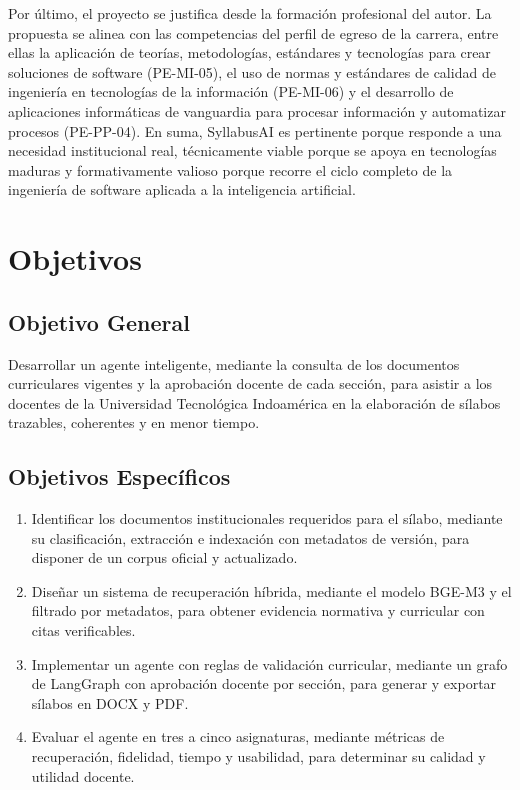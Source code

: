 Por último, el proyecto se justifica desde la formación profesional del autor. La propuesta se alinea con las competencias del perfil de egreso de la carrera, entre ellas la aplicación de teorías, metodologías, estándares y tecnologías para crear soluciones de software (PE-MI-05), el uso de normas y estándares de calidad de ingeniería en tecnologías de la información (PE-MI-06) y el desarrollo de aplicaciones informáticas de vanguardia para procesar información y automatizar procesos (PE-PP-04). En suma, SyllabusAI es pertinente porque responde a una necesidad institucional real, técnicamente viable porque se apoya en tecnologías maduras y formativamente valioso porque recorre el ciclo completo de la ingeniería de software aplicada a la inteligencia artificial.

\section{Objetivos}
\subsection{Objetivo General}
Desarrollar un agente inteligente, mediante la consulta de los documentos curriculares vigentes y la aprobación docente de cada sección, para asistir a los docentes de la Universidad Tecnológica Indoamérica en la elaboración de sílabos trazables, coherentes y en menor tiempo.

\subsection{Objetivos Específicos}
\begin{enumerate}
  \item Identificar los documentos institucionales requeridos para el sílabo, mediante su clasificación, extracción e indexación con metadatos de versión, para disponer de un corpus oficial y actualizado.
  \item Diseñar un sistema de recuperación híbrida, mediante el modelo BGE-M3 y el filtrado por metadatos, para obtener evidencia normativa y curricular con citas verificables.
  \item Implementar un agente con reglas de validación curricular, mediante un grafo de LangGraph con aprobación docente por sección, para generar y exportar sílabos en DOCX y PDF.
  \item Evaluar el agente en tres a cinco asignaturas, mediante métricas de recuperación, fidelidad, tiempo y usabilidad, para determinar su calidad y utilidad docente.
\end{enumerate}

